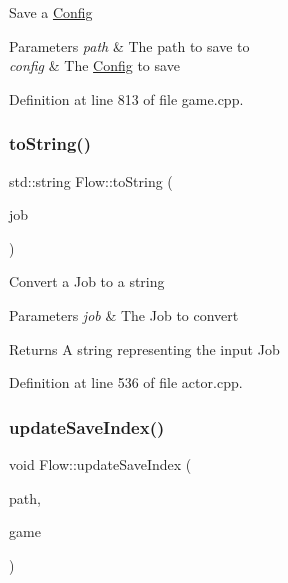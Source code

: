 Save a \hyperlink{struct_flow_1_1_config}{Config} 
\begin{DoxyParams}{Parameters}
{\em path} & The path to save to \\
\hline
{\em config} & The \hyperlink{struct_flow_1_1_config}{Config} to save \\
\hline
\end{DoxyParams}


Definition at line 813 of file game.\+cpp.

\hypertarget{namespace_flow_a6f3143a530f180f3bff735701d83f295}{}\label{namespace_flow_a6f3143a530f180f3bff735701d83f295} 
\subsubsection{\texorpdfstring{to\+String()}{toString()}}
{\footnotesize\ttfamily std\+::string Flow\+::to\+String (\begin{DoxyParamCaption}\item[{\hyperlink{namespace_flow_a05bb774db920847e46f3779aaef1b07b}{Flow\+::\+Job}}]{job }\end{DoxyParamCaption})}

Convert a Job to a string 
\begin{DoxyParams}{Parameters}
{\em job} & The Job to convert \\
\hline
\end{DoxyParams}
\begin{DoxyReturn}{Returns}
A string representing the input Job 
\end{DoxyReturn}


Definition at line 536 of file actor.\+cpp.

\hypertarget{namespace_flow_a0cd8a32e71f1630075020041656000ac}{}\label{namespace_flow_a0cd8a32e71f1630075020041656000ac} 
\subsubsection{\texorpdfstring{update\+Save\+Index()}{updateSaveIndex()}}
{\footnotesize\ttfamily void Flow\+::update\+Save\+Index (\begin{DoxyParamCaption}\item[{const std\+::string \&}]{path,  }\item[{const \hyperlink{class_flow_1_1_game}{Game} \&}]{game }\end{DoxyParamCaption})}

